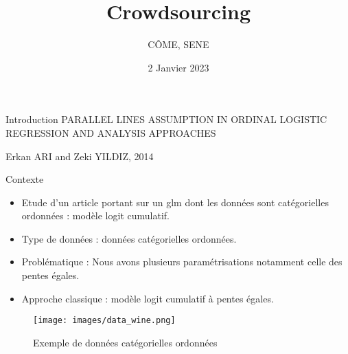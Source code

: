 \documentclass[11pt]{beamer}
\begin{document}
	\author{CÔME, SENE}
	\title[Projet UE HAX817X]{Crowdsourcing}
	\subtitle{}
	\date{2 Janvier 2023}
	\frame{\titlepage}
	
	
	
	
	\begin{frame}{Introduction}
		PARALLEL LINES ASSUMPTION IN ORDINAL LOGISTIC REGRESSION AND ANALYSIS APPROACHES\vspace{3mm}
		
		Erkan ARI and Zeki YILDIZ, 2014
		\begin{block}{Contexte}
			\begin{itemize}
				\item Etude d'un article portant sur un glm dont les données sont catégorielles ordonnées : modèle logit cumulatif.
				\item Type de données : données catégorielles ordonnées.
				\item Problématique : Nous avons plusieurs paramétrisations notamment celle des pentes égales.
				\item Approche classique : modèle logit cumulatif à pentes égales.
			\end{itemize}
			
		\end{block}
	\end{frame}
	
	\begin{frame}
		\begin{block}{}
			\begin{figure}[H]
				\centering
				\texttt{[image: images/data\_wine.png]}
				\caption{Exemple de données catégorielles ordonnées}
			\end{figure}
		\end{block}
	\end{frame}
	
\end{document}
